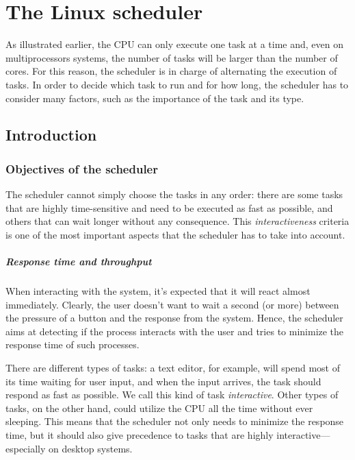 \chapter{The Linux scheduler} %
\label{ch:sched}

As illustrated earlier, the CPU can only execute one task at a time and, even on multiprocessors systems, the number of tasks will be larger than the number of cores. For this reason, the scheduler is in charge of alternating the execution of tasks. 
In order to decide which task to run and for how long, the scheduler has to consider many factors, such as the importance of the task and its type.

\section{Introduction}%

\subsection{Objectives of the scheduler}

The scheduler cannot simply choose the tasks in any order: there are some tasks that are highly time-sensitive and need to be executed as fast as possible, and others that can wait longer without any consequence. This \textit{interactiveness} criteria is one of the most important aspects that the scheduler has to take into account.

\paragraph{Response time and throughput}
When interacting with the system, it's expected that it will react almost
immediately. Clearly, the user doesn't want to wait a second (or more)
between the pressure of a button and the response from the
system. Hence, the scheduler aims at detecting if the process
interacts with the user and tries to minimize the response time of such
processes.

There are different types of tasks: a text editor, for example, will spend most of its time waiting for user input, and when the input arrives, the task should respond as fast as possible. We call this kind of task \textit{interactive}. Other types of tasks, on the other hand, could utilize the CPU all the time without ever sleeping.
This means that the scheduler not only needs to minimize the response time, but it should also give precedence to tasks that are highly interactive---especially on desktop systems.

